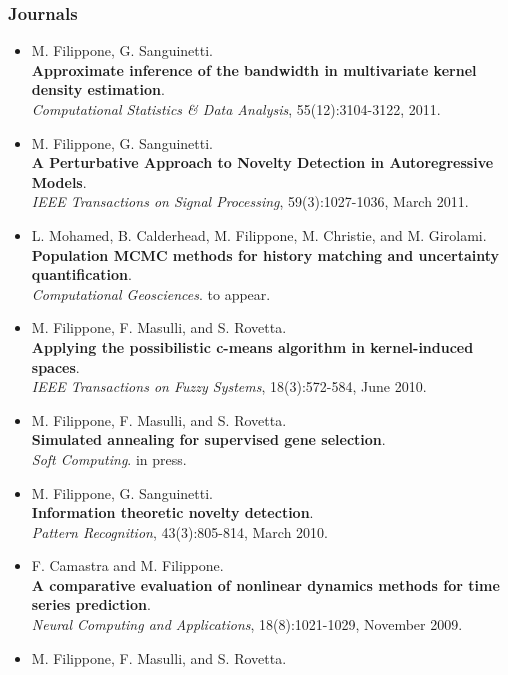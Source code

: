 \documentclass[a4paper,10pt]{article}
\begin{document}
\subsubsection*{Journals}
\begin{itemize}
     \item  M. Filippone, G. Sanguinetti.
       \\\textbf{Approximate inference of the bandwidth in multivariate kernel density estimation}.
       \\\emph{Computational Statistics \& Data Analysis}, 55(12):3104-3122, 2011.
     \item  M. Filippone, G. Sanguinetti.
       \\\textbf{A Perturbative Approach to Novelty Detection in Autoregressive Models}.
       \\\emph{IEEE Transactions on Signal Processing}, 59(3):1027-1036, March 2011.
     \item L. Mohamed, B. Calderhead, M. Filippone, M. Christie, and M. Girolami.
       \\\textbf{Population MCMC methods for history matching and uncertainty quantification}.
       \\\emph{Computational Geosciences}. to appear.
     \item  M. Filippone, F. Masulli, and S. Rovetta.
       \\\textbf{Applying the possibilistic c-means algorithm in kernel-induced spaces}.
       \\\emph{IEEE Transactions on Fuzzy Systems}, 18(3):572-584, June 2010.
     \item  M. Filippone, F. Masulli, and S. Rovetta.
       \\\textbf{Simulated annealing for supervised gene selection}.
       \\\emph{Soft Computing}. in press.
     \item  M. Filippone, G. Sanguinetti.
       \\\textbf{Information theoretic novelty detection}.
       \\\emph{Pattern Recognition}, 43(3):805-814, March 2010.
     \item  F. Camastra and M. Filippone.
       \\\textbf{A comparative evaluation of nonlinear dynamics methods for time series prediction}.
       \\\emph{Neural Computing and Applications}, 18(8):1021-1029, November 2009.
     \item  M. Filippone, F. Masulli, and S. Rovetta.

\end{itemize}
\end{document}
